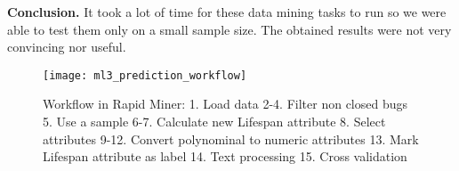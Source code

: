 {\bf Conclusion.} It took a lot of time for these data mining tasks to run so we were able to test them only on a small sample size. The obtained results were not very convincing nor useful.

\begin{figure}
\begin{center}
\texttt{[image: ml3\_prediction\_workflow]}
\caption{Workflow in Rapid Miner: 1. Load data 2-4. Filter non closed bugs 5. Use a sample 6-7. Calculate new Lifespan attribute 8. Select attributes 9-12. Convert polynominal to numeric attributes 13. Mark Lifespan attribute as label 14. Text processing 15. Cross validation }
\end{center}
\end{figure}
        
